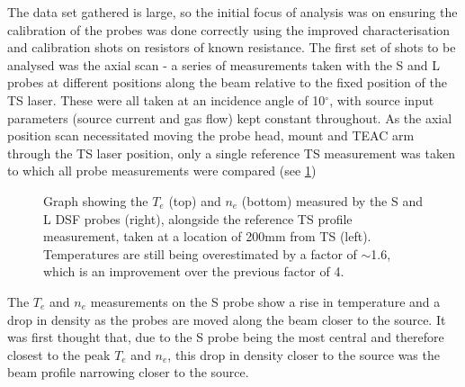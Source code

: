 \documentclass[a4paper, 12pt]{article} %
\begin{document}
	The data set gathered is large, so the initial focus of analysis was on ensuring the calibration of the probes was done correctly using the improved characterisation and calibration shots on resistors of known resistance. 
	The first set of shots to be analysed was the axial scan - a series of measurements taken with the S and L probes at different positions along the beam relative to the fixed position of the TS laser. 
	These were all taken at an incidence angle of 10$^{\circ}$, with source input parameters (source current and gas flow) kept constant throughout. 
	As the axial position scan necessitated moving the probe head, mount and TEAC arm through the TS laser position, only a single reference TS measurement was taken to which all probe measurements were compared (see \cref{fig:mag-axial-scan})
	\begin{figure}[!tb]
		\vspace{-20pt}
		\caption{
			Graph showing the $T_e$ (top) and $n_e$ (bottom) measured by the S and L DSF probes (right), alongside the reference TS profile measurement, taken at a location of 200mm from TS (left).
			Temperatures are still being overestimated by a factor of $\sim$1.6, which is an improvement over the previous factor of 4. 
			}
		\label{fig:mag-axial-scan}
		\vspace{-10pt}
	\end{figure}
	The $T_e$ and $n_e$ measurements on the S probe show a rise in temperature and a drop in density as the probes are moved along the beam closer to the source. 
	It was first thought that, due to the S probe being the most central and therefore closest to the peak $T_e$ and $n_e$, this drop in density closer to the source was the beam profile narrowing closer to the source. 
\end{document}
